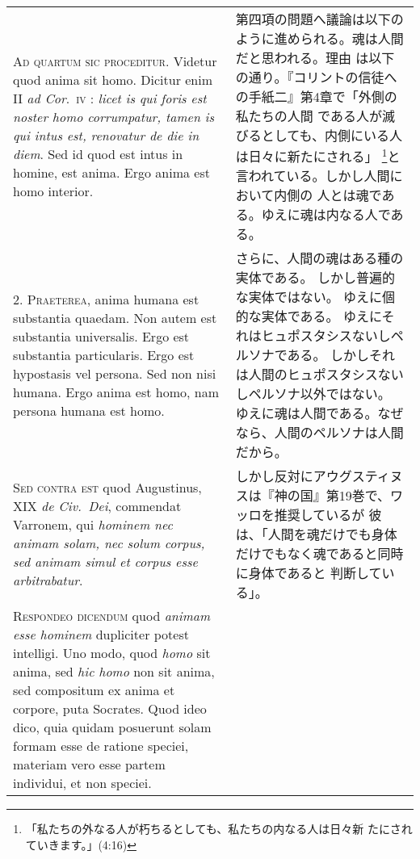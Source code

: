 \documentclass[10pt]{jsarticle} %
\begin{document}
\begin{longtable}{p{21em}p{21em}}
{\scshape Ad quartum sic proceditur}. Videtur quod anima sit homo. Dicitur enim
II {\itshape ad Cor}.~{\scshape iv} : {\itshape licet is qui foris est noster homo corrumpatur, tamen
is qui intus est, renovatur de die in diem}. Sed id quod est intus in
homine, est anima. Ergo anima est homo interior.


&

第四項の問題へ議論は以下のように進められる。魂は人間だと思われる。理由
は以下の通り。『コリントの信徒への手紙二』第4章で「外側の私たちの人間
である人が滅びるとしても、内側にいる人は日々に新たにされる」
\footnote{「私たちの外なる人が朽ちるとしても、私たちの内なる人は日々新
たにされていきます。」(4:16)}と言われている。しかし人間において内側の
人とは魂である。ゆえに魂は内なる人である。

\\




2. {\scshape Praeterea}, anima humana est substantia quaedam. Non autem est
 substantia universalis. Ergo est substantia particularis. Ergo est
 hypostasis vel persona. Sed non nisi humana. Ergo anima est homo, nam
 persona humana est homo.


&

さらに、人間の魂はある種の実体である。
しかし普遍的な実体ではない。
ゆえに個的な実体である。
ゆえにそれはヒュポスタシスないしペルソナである。
しかしそれは人間のヒュポスタシスないしペルソナ以外ではない。
ゆえに魂は人間である。なぜなら、人間のペルソナは人間だから。

\\




{\scshape Sed contra est} quod Augustinus, XIX {\itshape de Civ.~Dei}, commendat Varronem,
 qui {\itshape hominem nec animam solam, nec solum corpus, sed animam simul et
 corpus esse arbitrabatur}.


&

しかし反対にアウグスティヌスは『神の国』第19巻で、ワッロを推奨しているが
 彼は、「人間を魂だけでも身体だけでもなく魂であると同時に身体であると
 判断している」。

\\




{\scshape Respondeo dicendum} quod {\itshape animam esse hominem}
dupliciter potest intelligi. Uno modo, quod {\itshape homo} sit anima,
sed {\itshape hic homo} non sit anima, sed compositum ex anima et
corpore, puta Socrates. Quod ideo dico, quia quidam posuerunt solam
formam esse de ratione speciei, materiam vero esse partem individui,
et non speciei.


\end{longtable}
\end{document}
